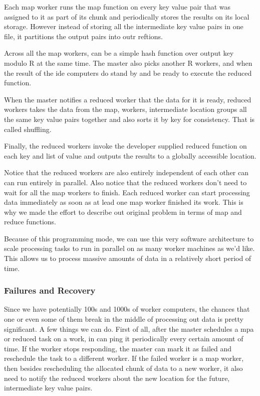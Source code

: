 Each map worker runs the map function on every key value pair that was assigned to it as part of its chunk and periodically stores the results on its local storage.
However instead of storing all the intermediate key value pairs in one file, it partitions the output pairs into outr reftions.

Across all the map workers, can be a simple hash function over output key modulo R at the same time.
The master also picks another R workers, and when the result of the ide computers do stand by and be ready to execute the reduced function.

When the master notifies a reduced worker that the data for it is ready, reduced workers takes the data from the map, workers, intermediate location groups all the same key value pairs together and also sorts it by key for consistency.
That is called shuffling.

Finally, the reduced workers invoke the developer supplied reduced function on each key and list of value and outputs the results to a globally accessible location.

Notice that the reduced workers are also entirely independent of each other can can run entirely in parallel.
Also notice that the reduced workers don't need to wait for all the map workers to finish.
Each reduced worker can start processing data immediately as soon as at lead one map worker finished its work.
This is why we made the effort to describe out original problem in terms of map and reduce functions.

Because of this programming mode, we can use this very software architecture to scale processing tasks to run in parallel on as many worker machines as we'd like.
This allows us to process massive amounts of data in a relatively short period of time.

\subsubsection{Failures and Recovery}
Since we have potentially 100s and 1000s of worker computers, the chances that one or even some of them break in the middle of processing out data is pretty significant.
A few things we can do.
First of all, after the master schedules a mpa or reduced task on a work, in can ping it periodically every certain amount of time.
If the worker stops responding, the master can mark it as failed and reschedule the task to a different worker.
If the failed worker is a map worker, then besides rescheduling the allocated chunk of data to a new worker, it also need to notify the reduced workers about the new location for the future, intermediate key value pairs.

